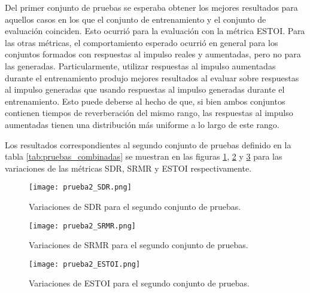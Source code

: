 Del primer conjunto de pruebas se esperaba obtener los mejores resultados para aquellos casos en los que el conjunto de entrenamiento y el conjunto de evaluación coinciden. Esto ocurrió para la evaluación con la métrica ESTOI. Para las otras métricas, el comportamiento esperado ocurrió en general para los conjuntos formados con respuestas al impulso reales y aumentadas, pero no para las generadas. Particularmente, utilizar respuestas al impulso aumentadas durante el entrenamiento produjo mejores resultados al evaluar sobre respuestas al impulso generadas que usando respuestas al impulso generadas durante el entrenamiento. Esto puede deberse al hecho de que, si bien ambos conjuntos contienen tiempos de reverberación del mismo rango, las respuestas al impulso aumentadas tienen una distribución más uniforme a lo largo de este rango.

Los resultados correspondientes al segundo conjunto de pruebas definido en la tabla \ref{tab:pruebas_combinadas} se muestran en las figuras \ref{fig:2_SDR}, \ref{fig:2_SRMR} y \ref{fig:2_ESTOI} para las variaciones de las métricas SDR, SRMR y ESTOI respectivamente.

\begin{figure}[H]
	\centering{}
	\texttt{[image: prueba2\_SDR.png]}
	\caption{Variaciones de SDR para el segundo conjunto de pruebas.}
	\label{fig:2_SDR}
\end{figure}

\begin{figure}[H]
	\centering{}
	\texttt{[image: prueba2\_SRMR.png]}
	\caption{Variaciones de SRMR para el segundo conjunto de pruebas.}
	\label{fig:2_SRMR}
\end{figure}

\begin{figure}[H]
	\centering{}
	\texttt{[image: prueba2\_ESTOI.png]}
	\caption{Variaciones de ESTOI para el segundo conjunto de pruebas.}
	\label{fig:2_ESTOI}
\end{figure}

